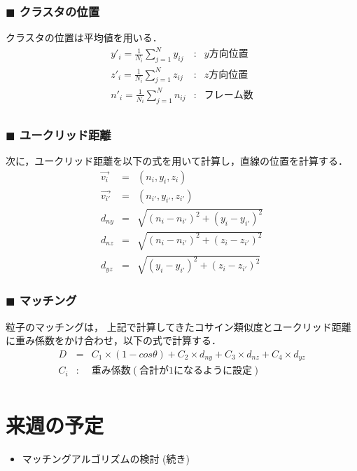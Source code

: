 \documentclass[twocolumn,a4j]{jsarticle}
\begin{document}
\subsubsection*{$\blacksquare$ クラスタの位置}
クラスタの位置は平均値を用いる．\\
\begin{eqnarray*}
  y'_i = \frac{1}{N_i} \sum_{j=1}^{N} y_{ij} &:& y方向位置  \\
  z'_i = \frac{1}{N_i} \sum_{j=1}^{N} z_{ij} &:& z方向位置  \\
  n'_i = \frac{1}{N_i} \sum_{j=1}^{N} n_{ij} &:& フレーム数 \\
\end{eqnarray*}

\subsubsection*{$\blacksquare$ ユークリッド距離}
次に，ユークリッド距離を以下の式を用いて計算し，直線の位置を計算する．
\begin{eqnarray*}
  \vec{v_i} &=& (n_i, y_i, z_i)\\
  \vec{v_{i'}} &=& (n_{i'}, y_{i'}, z_{i'})\\
  d_{ny} &=& \sqrt{(n_i - n_{i'})^2 + (y_i - y_{i'})^2}\\
  d_{nz} &=& \sqrt{(n_i - n_{i'})^2 + (z_i - z_{i'})^2}\\
  d_{yz} &=& \sqrt{(y_i - y_{i'})^2 + (z_i - z_{i'})^2}
\end{eqnarray*}

\subsubsection*{$\blacksquare$ マッチング}
粒子のマッチングは，
上記で計算してきたコサイン類似度とユークリッド距離に重み係数をかけ合わせ，以下の式で計算する．
\begin{eqnarray*}
  D &=& C_1 \times (1- cos\theta) + C_2\times d_{ny} + C_3 \times d_{nz} + C_4 \times d_{yz}\\
  C_i &:& 重み係数 (合計が1になるように設定)\\
\end{eqnarray*}

\section{来週の予定}
\begin{itemize}
  \item マッチングアルゴリズムの検討 (続き)
\end{itemize}
\end{document}
